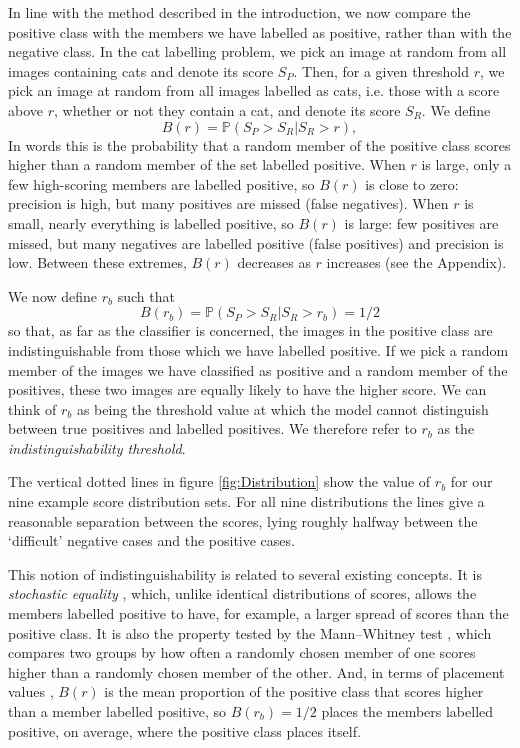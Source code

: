 \documentclass[preprint,12pt]{article}
\newcommand{\prob}{\mathbb{P}}  %
\begin{document}
In line with the method described in the introduction, we now compare the positive class with the members we have labelled as positive, rather than with the negative class. In the cat labelling problem, we pick an image at random from all images containing cats and denote its score $S_P$. Then, for a given threshold $r$, we pick an image at random from all images labelled as cats, i.e. those with a score above $r$, whether or not they contain a cat, and denote its score $S_R$. We define
\[
B(r) = \prob(S_P>S_R | S_R>r),
\]
In words this is the probability that a random member of the positive class scores higher than a random member of the set labelled positive. When $r$ is large, only a few high-scoring members are labelled positive, so $B(r)$ is close to zero: precision is high, but many positives are missed (false negatives). When $r$ is small, nearly everything is labelled positive, so $B(r)$ is large: few positives are missed, but many negatives are labelled positive (false positives) and precision is low. Between these extremes, $B(r)$ decreases as $r$ increases (see the Appendix).

We now define $r_b$ such that
 \begin{equation}
B(r_b) = \prob(S_P>S_R | S_R>r_b) = 1/2 \label{balanced}
\end{equation}
so that, as far as the classifier is concerned, the images in the positive class are indistinguishable from those which we have labelled positive. If we pick a random member of the images we have classified as positive and a random member of the positives, these two images are equally likely to have the higher score. We can think of $r_b$ as being the threshold value at which the model cannot distinguish between true positives and labelled positives. We therefore refer to $r_b$ as the {\it indistinguishability threshold}. 

The vertical dotted lines in figure \ref{fig:Distribution} show the value of $r_b$ for our nine example score distribution sets. For all nine distributions the lines give a reasonable separation between the scores, lying roughly halfway between the `difficult' negative cases and the positive cases. 

This notion of indistinguishability is related to several existing concepts. It is {\it stochastic equality} \cite{vargha2000critique}, which, unlike identical distributions of scores, allows the members labelled positive to have, for example, a larger spread of scores than the positive class. It is also the property tested by the Mann--Whitney test \cite{mann1947test}, which compares two groups by how often a randomly chosen member of one scores higher than a randomly chosen member of the other. And, in terms of placement values \cite{hanley1997sampling, pepe2004analysis}, $B(r)$ is the mean proportion of the positive class that scores higher than a member labelled positive, so $B(r_b)=1/2$ places the members labelled positive, on average, where the positive class places itself.
\end{document}
